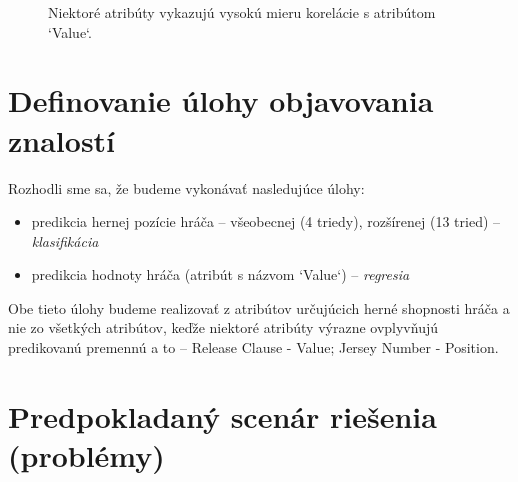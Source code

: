 \documentclass[runningheads]{llncs}
\begin{document}
\begin{figure}%
    \centering
    \qquad
    \caption{Niektoré atribúty vykazujú vysokú mieru korelácie s atribútom `Value`.}%
    \label{fig:wage_scatter_plot}%
\end{figure}


\section{Definovanie úlohy objavovania znalostí \label{task_definition}}

Rozhodli sme sa, že budeme vykonávať nasledujúce úlohy:
\begin{itemize}
    \item predikcia hernej pozície hráča -- všeobecnej (4 triedy), rozšírenej (13 tried) -- \textit{klasifikácia}
    \item predikcia hodnoty hráča (atribút s názvom `Value`) -- \textit{regresia}
\end{itemize}

Obe tieto úlohy budeme realizovať z atribútov určujúcich herné shopnosti hráča a nie zo všetkých atribútov, keďže niektoré atribúty výrazne ovplyvňujú predikovanú premennú a to -- Release Clause - Value; Jersey Number - Position. 

\section{Predpokladaný scenár riešenia (problémy)}
\end{document}
